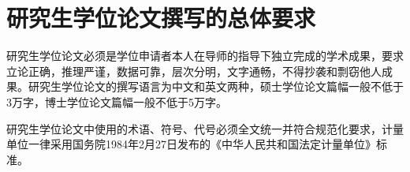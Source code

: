 \chapter{研究生学位论文撰写的总体要求}
研究生学位论文必须是学位申请者本人在导师的指导下独立完成的学术成果，要求立论正确，推理严谨，数据可靠，层次分明，文字通畅，不得抄袭和剽窃他人成果。研究生学位论文的撰写语言为中文和英文两种，硕士学位论文篇幅一般不低于3万字，博士学位论文篇幅一般不低于5万字。
\par
研究生学位论文中使用的术语、符号、代号必须全文统一并符合规范化要求，计量单位一律采用国务院1984年2月27日发布的《中华人民共和国法定计量单位》标准。
